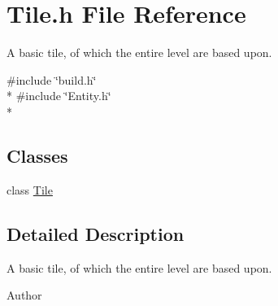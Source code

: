 \section{Tile.\-h File Reference}
\label{_tile_8h}


A basic tile, of which the entire level are based upon.  


{\ttfamily \#include \char`\"{}build.\-h\char`\"{}}\\*
{\ttfamily \#include \char`\"{}Entity.\-h\char`\"{}}\\*
\subsection*{Classes}
\begin{DoxyCompactItemize}
\item 
class \hyperlink{class_tile}{Tile}
\end{DoxyCompactItemize}


\subsection{Detailed Description}
A basic tile, of which the entire level are based upon. \begin{DoxyAuthor}{Author}

\end{DoxyAuthor}
